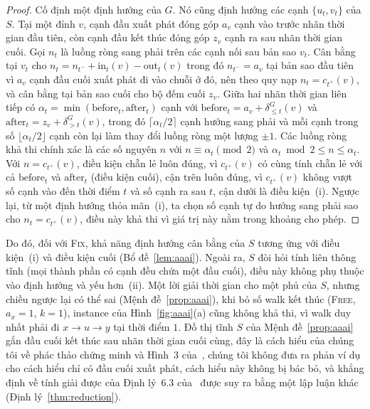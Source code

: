 \documentclass[pdflatex,sn-mathphys-num]{sn-jnl}
\theoremstyle{thmstyleone}
\theoremstyle{thmstyletwo}
\theoremstyle{thmstylethree}
\newcommand{\out}{\mathrm{out}}
\newcommand{\inn}{\mathrm{in}}
\newcommand{\FIX}{\textup{\textsc{Fix}}}
\newcommand{\FREE}{\textup{\textsc{Free}}}
\begin{document}
\begin{proof}
Cố định một định hướng của $G$. Nó cũng định hướng các cạnh $\{u_t,v_t\}$ của $S$. Tại một đỉnh $v$, cạnh đầu xuất phát đóng góp $a_v$ cạnh vào trước nhãn thời gian đầu tiên, còn cạnh đầu kết thúc đóng góp $z_v$ cạnh ra sau nhãn thời gian cuối. Gọi $n_t$ là luồng ròng sang phải trên các cạnh nối sau bản sao $v_t$. Cân bằng tại $v_t$ cho $n_t=n_{t^-}+\inn_t(v)-\out_t(v)$ trong đó $n_{t^-}=a_v$ tại bản sao đầu tiên vì $a_v$ cạnh đầu cuối xuất phát đi vào chuỗi ở đó, nên theo quy nạp $n_t=c_{t^+}(v)$, và cân bằng tại bản sao cuối cho bộ đếm cuối $z_v$. Giữa hai nhãn thời gian liên tiếp có $\alpha_t=\min(\mathrm{before}_t,\mathrm{after}_t)$ cạnh với $\mathrm{before}_t=a_v+\delta^G_{\le t}(v)$ và $\mathrm{after}_t=z_v+\delta^G_{>t}(v)$, trong đó $\lceil\alpha_t/2\rceil$ cạnh hướng sang phải và mỗi cạnh trong số $\lfloor\alpha_t/2\rfloor$ cạnh còn lại làm thay đổi luồng ròng một lượng $\pm1$. Các luồng ròng khả thi chính xác là các số nguyên $n$ với $n\equiv\alpha_t\pmod 2$ và $\alpha_t\bmod 2\le n\le\alpha_t$. Với $n=c_{t^+}(v)$, điều kiện chẵn lẻ luôn đúng, vì $c_{t^+}(v)$ có cùng tính chẵn lẻ với cả $\mathrm{before}_t$ và $\mathrm{after}_t$ (điều kiện cuối), cận trên luôn đúng, vì $c_{t^+}(v)$ không vượt số cạnh vào đến thời điểm $t$ và số cạnh ra sau $t$, cận dưới là điều kiện~(i). Ngược lại, từ một định hướng thỏa mãn~(i), ta chọn số cạnh tự do hướng sang phải sao cho $n_t=c_{t^+}(v)$, điều này khả thi vì giá trị này nằm trong khoảng cho phép.
\end{proof}

Do đó, đối với \FIX{}, khả năng định hướng cân bằng của $S$ tương ứng với điều kiện~(i) và điều kiện cuối (Bổ đề~\ref{lem:aaai}). Ngoài ra, $S$ đòi hỏi tính liên thông tĩnh (mọi thành phần có cạnh đều chứa một đầu cuối), điều này không phụ thuộc vào định hướng và yếu hơn~(ii). Một lời giải thời gian cho một phủ của $S$, nhưng chiều ngược lại có thể sai (Mệnh đề~\ref{prop:aaai}), khi bỏ số walk kết thúc (\FREE{}, $a_x=1$, $k=1$), instance của Hình~\ref{fig:aaai}(a) cũng không khả thi, vì walk duy nhất phải đi $x\to u\to y$ tại thời điểm $1$. Đồ thị tĩnh $S$ của Mệnh đề~\ref{prop:aaai} gắn đầu cuối kết thúc sau nhãn thời gian cuối cùng, đây là cách hiểu của chúng tôi về phác thảo chứng minh và Hình~3 của~\cite{deligkas2025}, chúng tôi không đưa ra phản ví dụ cho cách hiểu chỉ có đầu cuối xuất phát, cách hiểu này không bị bác bỏ, và khẳng định về tính giải được của Định lý~6.3 của~\cite{deligkas2025} được suy ra bằng một lập luận khác (Định lý~\ref{thm:reduction}).
\end{document}
